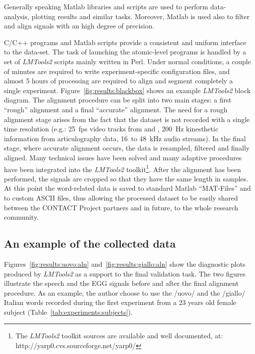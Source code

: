 Generally speaking Matlab libraries and scripts are used to perform
data-analysis, plotting results and similar tasks.
Moreover, Matlab is used also to filter and align signals with an
high degree of precision.

C/C++ programs and Matlab scripts provide a consistent and uniform interface to
the data-set.
The task of launching the atomic-level programs is handled by a set of
\emph{LMTools2} scripts mainly written in Perl.
Under normal conditions, a couple of minutes are required to write
experiment-specific configuration files, and almost 5 hours of processing 
are required to align and segment completely a single
experiment.
Figure~\ref{fig:results:blackbox} shows an example \emph{LMTools2} block
diagram.
The alignment procedure can be split into two main stages: a first ``rough''
alignment and a final ``accurate'' alignment.
The need for a rough alignment stage arises from the fact that the dataset
is not recorded with a single time resolution (e.g.: 25~fps video tracks from
 and , 200~Hz kinesthetic information from articulography data,
16~to 48~kHz audio streams).
In the final stage, where accurate alignment occurs, the data is resampled,
filtered and finally aligned.
Many technical issues have been solved and many adaptive procedures have been
integrated into the \emph{LMTools2} toolkit\footnote{The \emph{LMTools2}
toolkit sources are available and well documented, at: http://yarp0.cvs.sourceforge.net/yarp0/}.
%
%
%
After the alignment has been performed, the signals are cropped so that they 
have the same length in samples. At this point the word-related data is saved to
standard Matlab ``MAT-Files'' and to custom ASCII files, thus allowing the 
processed dataset to be easily shared between the CONTACT Project partners and
in future, to the whole research community.
\subsection{An example of the collected data}
Figures~\ref{fig:results:uovo:aln} and~\ref{fig:results:giallo:aln} show the
diagnostic plots produced by \emph{LMTools2} as a support to the final
validation task.
The two figures illustrate the speech and the EGG signals before and after the
final alignment procedure. As an example, the author choose to use the /uovo/
and the /giallo/ Italian words recorded during the first experiment from a 23
years old female subject (Table~\ref{tab:experiments:subjects}).

